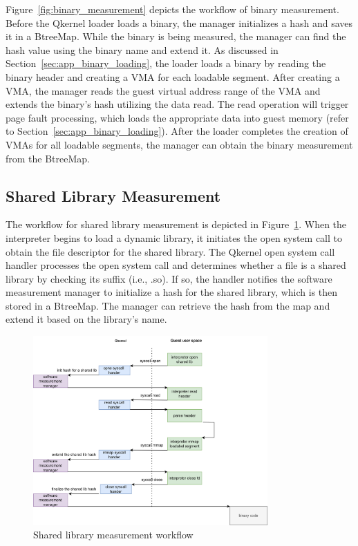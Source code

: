 Figure~\ref{fig:binary_measurement} depicts the workflow of binary measurement. Before the Qkernel loader loads a binary, the manager initializes a hash and saves it in a BtreeMap. While the binary is being measured, the manager can find the hash value using the binary name and extend it. 
As discussed in Section~\ref{sec:app_binary_loading}, the loader loads a binary by reading the binary header and creating a \acrshort{VMA} for each loadable segment. After creating a \acrshort{VMA}, the manager reads the guest virtual address range of the \acrshort{VMA} and extends the binary's hash utilizing 
the data read. The read operation will trigger page fault processing, which loads the appropriate data into guest memory (refer to Section~\ref{sec:app_binary_loading}). After the loader completes the creation of \acrshort{VMA}s for all loadable segments, the manager can obtain the binary measurement 
from the BtreeMap.




\subsection{Shared Library Measurement}

The workflow for shared library measurement is depicted in Figure~\ref{fig:measure_load_shared_libarart}. When the interpreter begins to load a dynamic library, it initiates the open system call to obtain the file descriptor for the shared library. The Qkernel open system call handler processes 
the open system call and determines whether a file is a shared library by checking its suffix (i.e., .so). If so, the handler notifies the software measurement manager to initialize a hash for the shared library, which is then stored in a BtreeMap. The manager can retrieve the hash from the map 
and extend it based on the library's name.


\begin{figure}[!htb]
    \centering
    \includegraphics[width=0.8\textwidth]{images/measure_load_shared_libarart.png}
    \caption[Shared library measurement workflow]{Shared library measurement workflow}
    \label{fig:measure_load_shared_libarart}
\end{figure}

